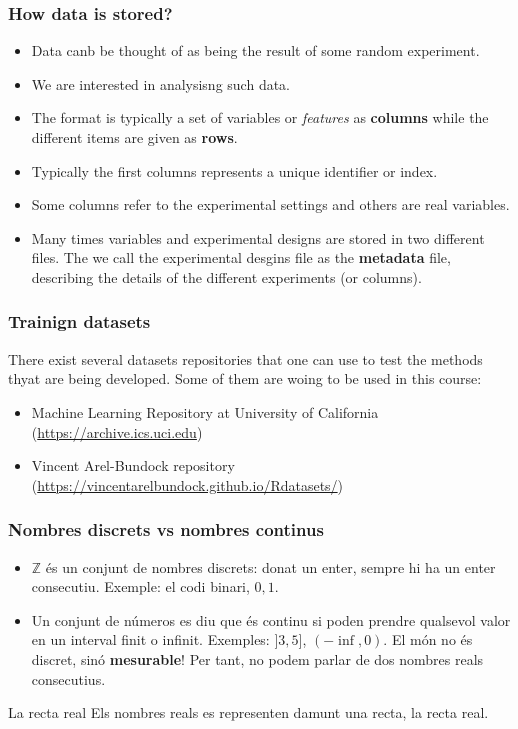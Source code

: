 \documentclass{beamer}
\begin{document}
\begin{frame}
\frametitle{How data is stored?}
\begin{itemize}
  \item Data canb be thought of as being the result of some random experiment.
  \item We are interested in analysisng such data.
  \item The format is typically a set of variables or {\em features} as {\bf columns} while the different items are given as {\bf rows}.
  \item Typically the first columns represents a unique identifier or index.
  \item Some columns refer to the experimental settings and others are real variables.
  \item Many times variables and experimental designs are stored in two different files. The we call the experimental desgins file as the {\bf metadata} file, describing the details of the different experiments (or columns).  
\end{itemize}
\end{frame}


\begin{frame}
\frametitle{Trainign datasets}
There exist several datasets repositories that one can use to test the methods thyat are being developed. Some of them are woing to be used in this course:
\begin{itemize}
\item Machine Learning Repository at University of California (\url{https://archive.ics.uci.edu})
\item Vincent Arel-Bundock repository (\url{https://vincentarelbundock.github.io/Rdatasets/})
\end{itemize}
\end{frame}

\begin{frame}
\frametitle{Nombres discrets vs nombres continus}
\begin{itemize}
\item $\mathbb{Z}$ és un conjunt de nombres discrets: donat un enter, sempre hi ha un enter consecutiu. Exemple: el codi binari, ${0,1}$.
\item Un conjunt de números es diu que és continu si poden prendre qualsevol valor en un interval finit o infinit. Exemples: $]3,5]$, $(-\inf,0)$. El món no és discret, sinó {\bf mesurable}! Per tant, no podem parlar de dos nombres reals consecutius.
\end{itemize}
\begin{exampleblock}{La recta real}
  Els nombres reals es representen damunt una recta, la recta real.
\end{exampleblock}
\end{frame}
\end{document}
